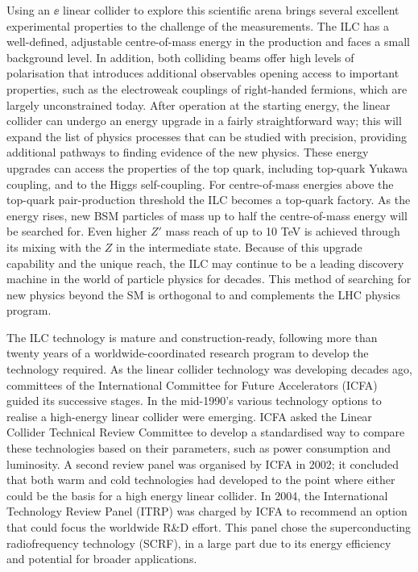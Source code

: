 Using an $\ee$ linear collider to explore this scientific arena
brings several excellent experimental properties to the
challenge of the measurements.
The ILC has a well-defined, adjustable centre-of-mass energy 
in the production and faces a small background level.
In addition, both colliding beams offer high levels of polarisation
that introduces additional observables opening access to
important properties, such as
the electroweak couplings of right-handed
fermions, 
which are largely unconstrained today.
After operation at the starting energy,
the linear collider can undergo an energy upgrade in a fairly
straightforward way; this will expand the list of physics processes that
can be studied with precision, providing additional pathways
to finding evidence of the new physics.
These energy upgrades can access the properties of the top quark,
including top-quark Yukawa coupling, and to the Higgs self-coupling.
For centre-of-mass energies above the top-quark pair-production threshold
the ILC becomes a top-quark factory.
As the energy rises, new BSM particles of mass up to half
the centre-of-mass energy will be searched for.
Even higher $Z'$ mass reach of up to 10 TeV
 is achieved through its 
mixing with the  $Z$ in the intermediate state.
Because of this upgrade capability and the unique reach, the ILC may
continue to be a leading discovery machine in the 
world of particle physics for decades.
This method of searching for 
new physics beyond the SM is orthogonal to and complements 
the LHC physics program.


The ILC technology is mature and construction-ready, following
more than twenty years of a worldwide-coordinated 
research program to develop the technology required.
As the linear collider technology was developing
decades ago,
committees of   the International Committee for Future Accelerators
(ICFA) guided its successive stages.
In the mid-1990's various technology options to
realise a high-energy linear collider were emerging. 
ICFA asked the 
Linear Collider Technical Review Committee to develop a standardised
way to  compare  these  technologies based on their parameters, such as
power consumption and luminosity. A second
review panel was organised by ICFA in 2002;
it concluded that both warm and cold technologies had
developed to the point where either could be the basis for a
high energy linear
collider. In 2004, the  International Technology Review Panel
(ITRP) was charged by ICFA to recommend an option that could focus the
worldwide R\&D effort.  This panel chose the  superconducting
radiofrequency technology (SCRF), in a large part due to its
energy efficiency and potential for broader applications. 


